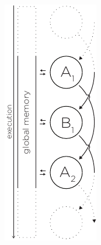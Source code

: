 
\begin{figure}
  \begin{minipage}[t]{0.23\textwidth}
    \centering
    \includegraphics[page=1, height=2\linewidth]{../resources/invariance.pdf}

\end{minipage}
\end{figure}
